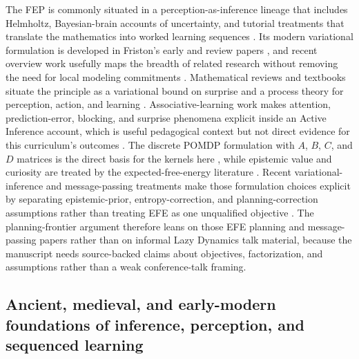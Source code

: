 \documentclass[
  english,
]{article}
\begin{document}
The FEP is commonly situated in a perception-as-inference lineage that
includes Helmholtz, Bayesian-brain accounts of uncertainty, and tutorial
treatments that translate the mathematics into worked learning sequences
\citep{helmholtz1867handbuch, knill2004bayesian, bogacz2017tutorial, sprevak2023predictive}.
Its modern variational formulation is developed in Friston's early and
review papers \citep{friston2006free, friston2010free}, and recent
overview work usefully maps the breadth of related research without
removing the need for local modeling commitments
\citep{friston2023simpler, zhang2024overview}. Mathematical reviews and
textbooks situate the principle as a variational bound on surprise and a
process theory for perception, action, and learning
\citep{buckley2017free, parr2022active, smith2022tutorial, pezzulo2024sentient_behavior}.
Associative-learning work makes attention, prediction-error, blocking,
and surprise phenomena explicit inside an Active Inference account,
which is useful pedagogical context but not direct evidence for this
curriculum's outcomes \citep{anokhin2024associative_active_inference}.
The discrete POMDP formulation with \(A\), \(B\), \(C\), and \(D\)
matrices is the direct basis for the kernels here
\citep{friston2017process, dacosta2020synthesis}, while epistemic value
and curiosity are treated by the expected-free-energy literature
\citep{friston2015epistemic, friston2017curiosity, millidge2021whence, sajid2021demystified, champion2026reframing}.
Recent variational-inference and message-passing treatments make those
formulation choices explicit by separating epistemic-prior,
entropy-correction, and planning-correction assumptions rather than
treating EFE as one unqualified objective
\citep{nuijten2026what_type_inference, nuijten2026efe_planning_vi, nuijten2025message_passing_efe}.
The planning-frontier argument therefore leans on those EFE planning and
message-passing papers rather than on informal Lazy Dynamics talk
material, because the manuscript needs source-backed claims about
objectives, factorization, and assumptions rather than a weak
conference-talk framing.

\subsection{Ancient, medieval, and early-modern foundations of
inference, perception, and sequenced
learning}\label{ancient-medieval-and-early-modern-foundations-of-inference-perception-and-sequenced-learning}
\end{document}
